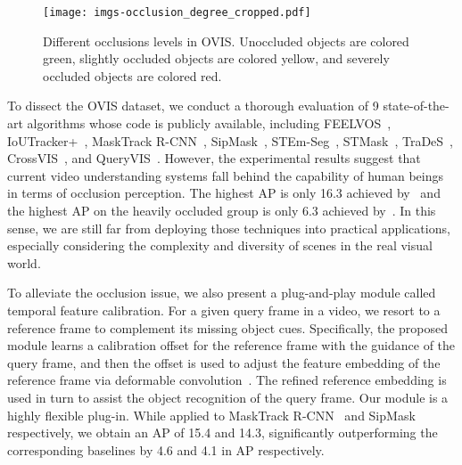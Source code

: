 \documentclass[twocolumn]{svjour3}          \smartqed  \usepackage{graphicx}
\begin{document}
\begin{sloppypar}
\begin{figure*}[t]
\centering
\texttt{[image: imgs-occlusion\_degree\_cropped.pdf]}
\caption{Different occlusions levels in OVIS. Unoccluded objects are colored green, slightly occluded objects are colored yellow, and severely occluded objects are colored red.}
\label{fig:various_occlusion}
\end{figure*}

To dissect the OVIS dataset, we conduct a thorough evaluation of 9 state-of-the-art algorithms whose code is publicly available, including FEELVOS~\cite{feelvos}, IoUTracker+~\cite{youtube_vis},  MaskTrack R-CNN~\cite{youtube_vis}, SipMask~\cite{sipmask}, STEm-Seg~\cite{stem_seg}, STMask~\cite{stmask}, TraDeS~\cite{trades}, CrossVIS~\cite{crossvis}, and QueryVIS~\cite{queryinst}. However, the experimental results suggest that current video understanding systems fall behind the capability of human beings in terms of occlusion perception. The highest AP is only 16.3 achieved by~\cite{crossvis} and the highest AP on the heavily occluded group is only 6.3 achieved by~\cite{stmask}. In this sense, we are still far from deploying those techniques into practical applications, especially considering the complexity and diversity of scenes in the real visual world.

To alleviate the occlusion issue, we also present a plug-and-play module called temporal feature calibration. For a given query frame in a video, we resort to a reference frame to complement its missing object cues. Specifically, the proposed module learns a calibration offset for the reference frame with the guidance of the query frame, and then the offset is used to adjust the feature embedding of the reference frame via deformable convolution~\cite{deformable}. The refined reference embedding is used in turn to assist the object recognition of the query frame. Our module is a highly flexible plug-in. While applied to MaskTrack R-CNN~\cite{youtube_vis} and SipMask~\cite{sipmask} respectively, we obtain an AP of 15.4 and 14.3, significantly outperforming the corresponding baselines by 4.6 and 4.1 in AP respectively.


\end{sloppypar}
\end{document}
